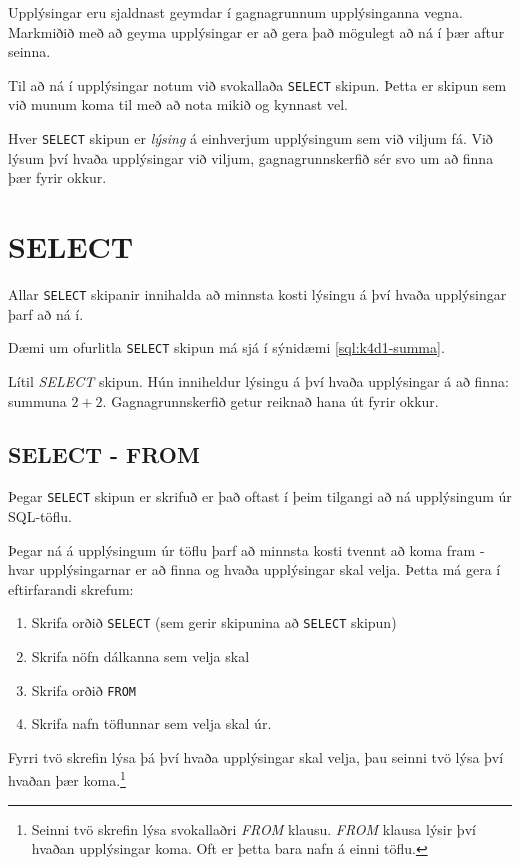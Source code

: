 Upplýsingar eru sjaldnast geymdar í gagnagrunnum upplýsinganna vegna. Markmiðið með að geyma upplýsingar er að gera það mögulegt að ná í þær aftur seinna.

Til að ná í upplýsingar notum við svokallaða \verb|SELECT| skipun. Þetta er skipun sem við munum koma til með að nota mikið og kynnast vel.

Hver \verb|SELECT| skipun er \emph{lýsing} á einhverjum upplýsingum sem við viljum fá. Við lýsum því hvaða upplýsingar við viljum, gagnagrunnskerfið sér svo um að finna þær fyrir okkur.
\section{SELECT}
Allar \verb|SELECT| skipanir innihalda að minnsta kosti lýsingu á því hvaða upplýsingar þarf að ná í.

Dæmi um ofurlitla \verb|SELECT| skipun má sjá í sýnidæmi \ref{sql:k4d1-summa}.

\begin{example}
\caption[Lágmarks SELECT]{Lítil \emph{SELECT} skipun. Hún inniheldur lýsingu á því hvaða upplýsingar á að finna: summuna $2+2$. Gagnagrunnskerfið getur reiknað hana út fyrir okkur.}
\label{sql:k4d1-summa}
\centering
{}
\end{example}

\subsection{SELECT - FROM}
\label{undirkafli:from}
Þegar \verb|SELECT| skipun er skrifuð er það oftast í þeim tilgangi að ná upplýsingum úr SQL-töflu.

Þegar ná á upplýsingum úr töflu þarf að minnsta kosti tvennt að koma fram - hvar upplýsingarnar er að finna og hvaða upplýsingar skal velja. Þetta má gera í eftirfarandi skrefum:
\newpage
\begin{enumerate}
 \item Skrifa orðið \verb|SELECT| (sem gerir skipunina að \verb|SELECT| skipun)
 \item Skrifa nöfn dálkanna sem velja skal
 \item Skrifa orðið \verb|FROM|
 \item Skrifa nafn töflunnar sem velja skal úr.
\end{enumerate}
Fyrri tvö skrefin lýsa þá því hvaða upplýsingar skal velja, þau seinni tvö lýsa því hvaðan þær koma.\footnote{Seinni tvö skrefin lýsa svokallaðri \emph{FROM} klausu. \emph{FROM} klausa lýsir því hvaðan upplýsingar koma. Oft er þetta bara nafn á einni töflu.}

